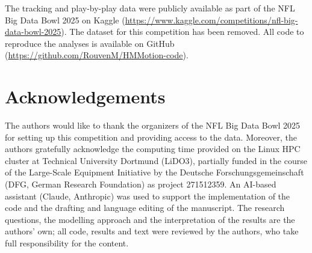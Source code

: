 \documentclass[namedate,webpdf,modern,medium]{oup-authoring-template}
\begin{document}
The tracking and play-by-play data were publicly available as part of the NFL Big Data Bowl 2025 on Kaggle (\url{https://www.kaggle.com/competitions/nfl-big-data-bowl-2025}). The dataset for this competition has been removed. All code to reproduce the analyses is available on GitHub (\url{https://github.com/RouvenM/HMMotion-code}).

\section*{Acknowledgements}
The authors would like to thank the organizers of the NFL Big Data Bowl 2025 for setting up this competition and providing access to the data.
Moreover, the authors gratefully acknowledge the computing time provided on the Linux HPC cluster at Technical University Dortmund (LiDO3), partially funded in the course of the Large-Scale Equipment Initiative by the Deutsche Forschungsgemeinschaft (DFG, German Research Foundation) as project 271512359. An AI-based assistant (Claude, Anthropic) was used to support the implementation of the code and the drafting and language editing of the manuscript. The research questions, the modelling approach and the interpretation of the results are the authors' own; all code, results and text were reviewed by the authors, who take full responsibility for the content.
\end{document}
